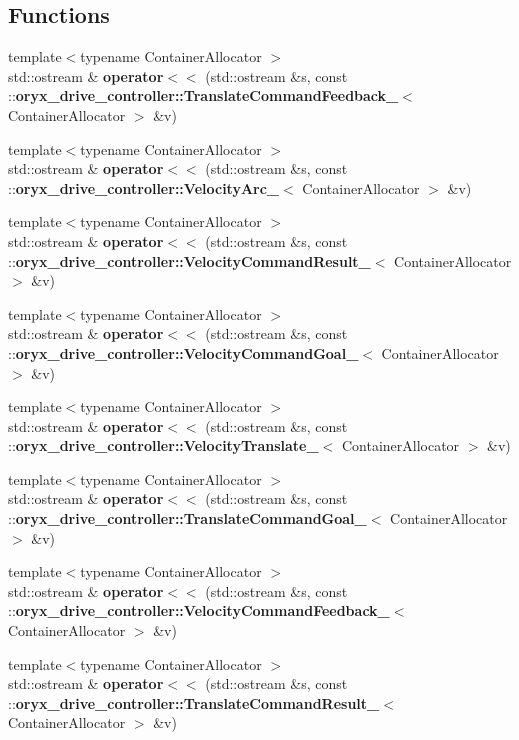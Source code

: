 \subsection*{\-Functions}
\begin{DoxyCompactItemize}
\item 
{\footnotesize template$<$typename Container\-Allocator $>$ }\\std\-::ostream \& {\bf operator$<$$<$} (std\-::ostream \&s, const \-::{\bf oryx\-\_\-drive\-\_\-controller\-::\-Translate\-Command\-Feedback\-\_\-}$<$ \-Container\-Allocator $>$ \&v)
\item 
{\footnotesize template$<$typename Container\-Allocator $>$ }\\std\-::ostream \& {\bf operator$<$$<$} (std\-::ostream \&s, const \-::{\bf oryx\-\_\-drive\-\_\-controller\-::\-Velocity\-Arc\-\_\-}$<$ \-Container\-Allocator $>$ \&v)
\item 
{\footnotesize template$<$typename Container\-Allocator $>$ }\\std\-::ostream \& {\bf operator$<$$<$} (std\-::ostream \&s, const \-::{\bf oryx\-\_\-drive\-\_\-controller\-::\-Velocity\-Command\-Result\-\_\-}$<$ \-Container\-Allocator $>$ \&v)
\item 
{\footnotesize template$<$typename Container\-Allocator $>$ }\\std\-::ostream \& {\bf operator$<$$<$} (std\-::ostream \&s, const \-::{\bf oryx\-\_\-drive\-\_\-controller\-::\-Velocity\-Command\-Goal\-\_\-}$<$ \-Container\-Allocator $>$ \&v)
\item 
{\footnotesize template$<$typename Container\-Allocator $>$ }\\std\-::ostream \& {\bf operator$<$$<$} (std\-::ostream \&s, const \-::{\bf oryx\-\_\-drive\-\_\-controller\-::\-Velocity\-Translate\-\_\-}$<$ \-Container\-Allocator $>$ \&v)
\item 
{\footnotesize template$<$typename Container\-Allocator $>$ }\\std\-::ostream \& {\bf operator$<$$<$} (std\-::ostream \&s, const \-::{\bf oryx\-\_\-drive\-\_\-controller\-::\-Translate\-Command\-Goal\-\_\-}$<$ \-Container\-Allocator $>$ \&v)
\item 
{\footnotesize template$<$typename Container\-Allocator $>$ }\\std\-::ostream \& {\bf operator$<$$<$} (std\-::ostream \&s, const \-::{\bf oryx\-\_\-drive\-\_\-controller\-::\-Velocity\-Command\-Feedback\-\_\-}$<$ \-Container\-Allocator $>$ \&v)
\item 
{\footnotesize template$<$typename Container\-Allocator $>$ }\\std\-::ostream \& {\bf operator$<$$<$} (std\-::ostream \&s, const \-::{\bf oryx\-\_\-drive\-\_\-controller\-::\-Translate\-Command\-Result\-\_\-}$<$ \-Container\-Allocator $>$ \&v)

\end{DoxyCompactItemize}
